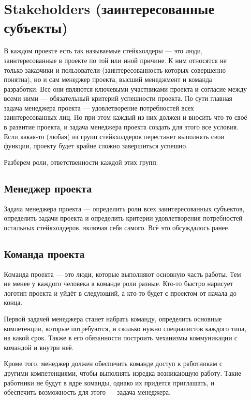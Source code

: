 \documentclass{../../text-style}
\begin{document}
\section{Stakeholders (заинтересованные субъекты)}

В каждом проекте есть так называемые стейкхолдеры --- это люди, заинтересованные в проекте по той или иной причине. К ним относятся не только заказчики и пользователи (заинтересованность которых совершенно понятна), но и сам менеджер проекта, высший менеджмент и команда разработки. Все они являются ключевыми участниками проекта и согласие между всеми ними --- обязательный критерий успешности проекта. По сути главная задача менеджера проекта --- удовлетворение потребностей всех заинтересованных лиц. Но при этом каждый из них должен и вносить что-то своё в развитие проекта, и задача менеджера проекта создать для этого все условия. Если какая-то (любая) из групп стейкхолдеров перестанет выполнять свои функции, проекту будет крайне сложно завершиться успешно.

Разберем роли, ответственности каждой этих групп.

\subsection{Менеджер проекта}

Задача менеджера проекта --- определить роли всех заинтересованных субъектов, определить задачи проекта и определить критерии удовлетворения потребностей остальных стейкхолдеров, включая себя самого. Всё это обсуждалось ранее. 

\subsection{Команда проекта}

Команда проекта --- это люди, которые выполняют основную часть работы. Тем не менее у каждого человека в команде роли разные. Кто-то быстро нарисует логотип проекта и уйдёт в следующий, а кто-то будет с проектом от начала до конца.

Первой задачей менеджера станет набрать команду, определить основные компетенции, которые потребуются, и сколько нужно специалистов каждого типа, на какой срок. Также в его обязанности построить механизмы коммуникации с командой и внутри неё.

Кроме того, менеджер должен обеспечить команде доступ к работникам с другими компетенциями, чтобы выполнять изредка возникающую работу. Такие работники не будут в ядре команды, однако их придется приглашать, и обеспечить возможность для этого --- задача менеджера.
\end{document}
